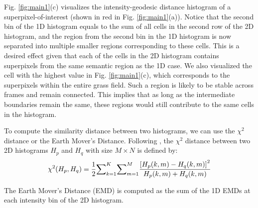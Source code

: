 \documentclass[runningheads]{llncs}
\begin{document}

Fig. \ref{fig:main1}(c) visualizes the intensity-geodesic distance histogram of a superpixel-of-interest (shown in red in Fig. \ref{fig:main1}(a)). Notice that the second bin of the 1D histogram equals to the sum of all cells in the second row of the 2D histogram, and the region from the second bin in the 1D histogram is now separated into multiple smaller regions corresponding to these cells. This is a desired effect given that each of the cells in the 2D histogram  contains superpixels from the same semantic region as the 1D case. We also visualized the cell with the highest value in Fig. \ref{fig:main1}(c), which corresponds to the superpixels within the entire grass field. Such a region is likely to be stable across frames and remain connected. This implies that as long as the intermediate boundaries remain the same, these regions would still contribute to the same cells in the histogram.

To compute the similarity distance between two histograms, we can use the $\chi^2$ distance or the Earth Mover's Distance. Following \cite{geohis}, the  ${\chi}^2$ distance between two 2D histograms $H_p$ and $H_q$ with size $M \times N$ is  defined by:
\begin{equation}
{\chi}^2 (H_p,H_q) = {1\over  2} {\sum}_{k=1}^K {\sum}_{m=1}^M  {{[H_p (k,m) -H_q (k,m)]}^2 \over   H_p (k,m) +H_q (k,m)}
\end{equation}

The Earth Mover's Distance (EMD) is computed as the sum of the 1D EMDs at each intensity bin of the 2D histogram.
\end{document}
